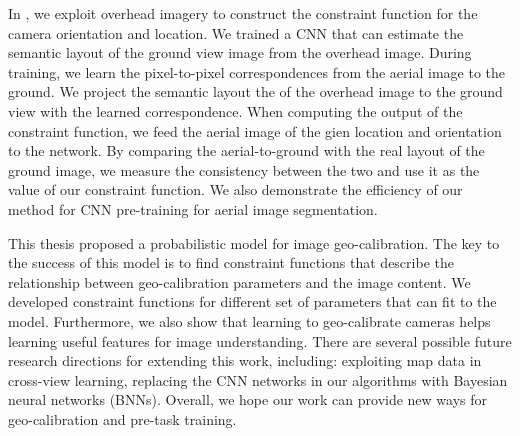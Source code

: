 In , we exploit overhead imagery to construct
the constraint function for the camera orientation and location.
We trained a CNN that can estimate the semantic layout of the ground
view image from the overhead image. During training, we learn the
pixel-to-pixel correspondences from the aerial image to the ground. We
project the semantic layout the of the overhead image to the ground
view with the learned correspondence.
When computing the output of the constraint function, we feed the
aerial image of the gien location and orientation to the network. By
comparing the aerial-to-ground with the real layout of the ground
image, we measure the consistency between the two and use
it as the value of our constraint function.
We also demonstrate the efficiency of our method for CNN pre-training
for aerial image segmentation.

This thesis proposed a probabilistic model for image
geo-calibration.
The key to the success of this model is to find constraint
functions that describe the relationship between geo-calibration
parameters and the image content. We developed constraint
functions for different set of parameters that can fit to the model.
Furthermore, we also show that learning to geo-calibrate cameras helps learning
useful features for image understanding.
There are several possible future research directions for extending
this work, including: exploiting map data in cross-view learning,
replacing the CNN networks in our algorithms with Bayesian neural
networks (BNNs).
Overall, we hope our work can provide new ways for geo-calibration and
pre-task training.
